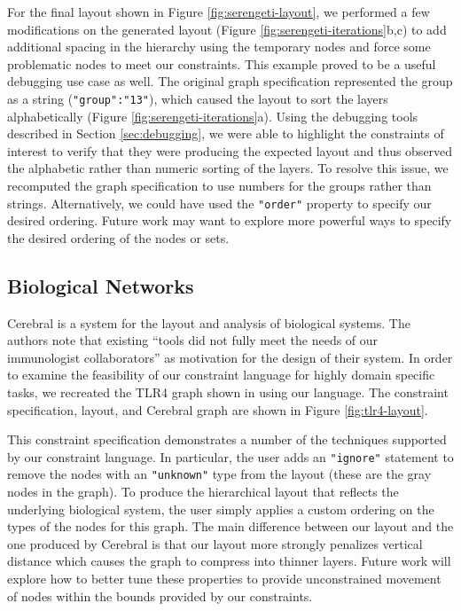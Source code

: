 \serengetiIterations
For the final layout shown in Figure \ref{fig:serengeti-layout}, we performed a few modifications on the generated layout (Figure \ref{fig:serengeti-iterations}b,c) to add additional spacing in the hierarchy using the temporary nodes and force some problematic nodes to meet our constraints. This example proved to be a useful debugging use case as well. The original graph specification represented the group as a string (\texttt{"group":"13"}), which caused the layout to sort the layers alphabetically (Figure \ref{fig:serengeti-iterations}a). Using the debugging tools described in Section \ref{sec:debugging}, we were able to highlight the constraints of interest to verify that they were producing the expected layout and thus observed the alphabetic rather than numeric sorting of the layers. To resolve this issue, we recomputed the graph specification to use numbers for the groups rather than strings. Alternatively, we could have used the \texttt{"order"} property to specify our desired ordering. Future work may want to explore more powerful ways to specify the desired ordering of the nodes or sets.

\subsection{Biological Networks}
\tlrFourLayout
Cerebral \cite{barsky2008cerebral} is a system for the layout and analysis of biological systems. The authors note that existing ``tools did not fully meet the needs of our immunologist collaborators'' as motivation for the design of their system. In order to examine the feasibility of our constraint language for highly domain specific tasks, we recreated the TLR4 graph shown in \cite{barsky2008cerebral} using our language. The constraint specification, layout, and Cerebral graph are shown in Figure \ref{fig:tlr4-layout}.

This constraint specification demonstrates a number of the techniques supported by our constraint language. In particular, the user adds an \texttt{"ignore"} statement to remove the nodes with an \texttt{"unknown"} type from the layout (these are the gray nodes in the graph). To produce the hierarchical layout that reflects the underlying biological system, the user simply applies a custom ordering on the types of the nodes for this graph. The main difference between our layout and the one produced by Cerebral is that our layout more strongly penalizes vertical distance which causes the graph to compress into thinner layers. Future work will explore how to better tune these properties to provide unconstrained movement of nodes within the bounds provided by our constraints.
